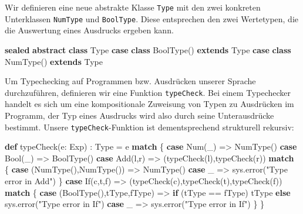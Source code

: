 \documentclass[]{article}
\newenvironment{Shaded}{}{}
\newcommand{\FunctionTok}[1]{\textcolor[rgb]{0.02,0.16,0.49}{#1}}
\newcommand{\KeywordTok}[1]{\textcolor[rgb]{0.00,0.44,0.13}{\textbf{#1}}}
\newcommand{\NormalTok}[1]{#1}
\newcommand{\StringTok}[1]{\textcolor[rgb]{0.25,0.44,0.63}{#1}}
\begin{document}
Wir definieren eine neue abstrakte Klasse \texttt{Type} mit den zwei
konkreten Unterklassen \texttt{NumType} und \texttt{BoolType}. Diese
entsprechen den zwei Wertetypen, die die Auswertung eines Ausdrucks
ergeben kann.

\begin{Shaded}
\begin{Highlighting}[]
\KeywordTok{sealed} \KeywordTok{abstract} \KeywordTok{class}\NormalTok{ Type}
\KeywordTok{case} \KeywordTok{class} \FunctionTok{BoolType}\NormalTok{() }\KeywordTok{extends}\NormalTok{ Type}
\KeywordTok{case} \KeywordTok{class} \FunctionTok{NumType}\NormalTok{() }\KeywordTok{extends}\NormalTok{ Type}
\end{Highlighting}
\end{Shaded}

Um Typechecking auf Programmen bzw. Ausdrücken unserer Sprache
durchzuführen, definieren wir eine Funktion \texttt{typeCheck}. Bei
einem Typechecker handelt es sich um eine kompositionale Zuweisung von
Typen zu Ausdrücken im Programm, der Typ eines Ausdrucks wird also durch
seine Unterausdrücke bestimmt. Unsere \texttt{typeCheck}-Funktion ist
dementsprechend strukturell rekursiv:

\begin{Shaded}
\begin{Highlighting}[]
\KeywordTok{def} \FunctionTok{typeCheck}\NormalTok{(e: Exp) : Type = e }\KeywordTok{match}\NormalTok{ \{}
  \KeywordTok{case} \FunctionTok{Num}\NormalTok{(\_) =\textgreater{} }\FunctionTok{NumType}\NormalTok{()}
  \KeywordTok{case} \FunctionTok{Bool}\NormalTok{(\_) =\textgreater{} }\FunctionTok{BoolType}\NormalTok{()}
  \KeywordTok{case} \FunctionTok{Add}\NormalTok{(l,r) =\textgreater{} (}\FunctionTok{typeCheck}\NormalTok{(l),}\FunctionTok{typeCheck}\NormalTok{(r)) }\KeywordTok{match}\NormalTok{ \{}
    \KeywordTok{case}\NormalTok{ (}\FunctionTok{NumType}\NormalTok{(),}\FunctionTok{NumType}\NormalTok{()) =\textgreater{} }\FunctionTok{NumType}\NormalTok{()}
    \KeywordTok{case}\NormalTok{ \_ =\textgreater{} sys.}\FunctionTok{error}\NormalTok{(}\StringTok{"Type error in Add"}\NormalTok{)}
\NormalTok{  \}}
  \KeywordTok{case} \FunctionTok{If}\NormalTok{(c,t,f) =\textgreater{} (}\FunctionTok{typeCheck}\NormalTok{(c),}\FunctionTok{typeCheck}\NormalTok{(t),}\FunctionTok{typeCheck}\NormalTok{(f)) }\KeywordTok{match}\NormalTok{ \{}
    \KeywordTok{case}\NormalTok{ (}\FunctionTok{BoolType}\NormalTok{(),tType,fType) =\textgreater{}}
      \KeywordTok{if}\NormalTok{ (tType == fType) tType }\KeywordTok{else}\NormalTok{ sys.}\FunctionTok{error}\NormalTok{(}\StringTok{"Type error in If"}\NormalTok{)}
    \KeywordTok{case}\NormalTok{ \_ =\textgreater{} sys.}\FunctionTok{error}\NormalTok{(}\StringTok{"Type error in If"}\NormalTok{)}
\NormalTok{  \}}
\NormalTok{\}}
\end{Highlighting}
\end{Shaded}
\end{document}
